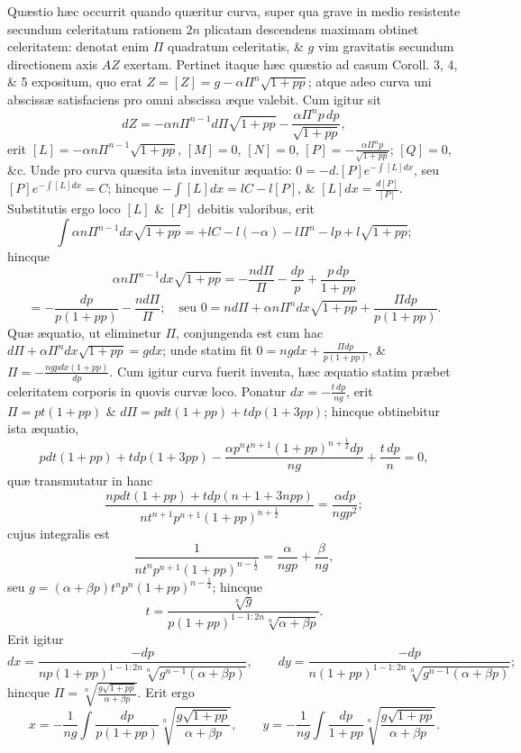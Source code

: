 Quæstio hæc occurrit quando quæritur curva, super qua grave in medio resistente secundum celeritatum rationem $2n$ plicatam descendens maximam obtinet celeritatem: denotat enim $\Pi$ quadratum celeritatis, \& $g$ vim gravitatis secundum directionem axis $AZ$ exertam. Pertinet itaque hæc quæstio ad casum Coroll. 3, 4, \& 5 expositum, quo erat $Z=[Z]=g-\alpha\Pi^n\sqrt{1+pp}$; atque adeo curva uni abscissæ satisfaciens pro omni abscissa æque valebit. Cum igitur sit
\[
dZ=-\alpha n\Pi^{n-1}d\Pi\sqrt{1+pp}-\frac{\alpha\Pi^n p\,dp}{\sqrt{1+pp}},
\]
erit $[L]=-\alpha n\Pi^{n-1}\sqrt{1+pp}$, $[M]=0$, $[N]=0$, $[P]=-\frac{\alpha\Pi^n p}{\sqrt{1+pp}}$; $[Q]=0$, \&c. Unde pro curva quæsita ista invenitur æquatio: $0=-d.[P]e^{-\int[L]dx}$, seu $[P]e^{-\int[L]dx}=C$; hincque $-\int[L]dx=lC-l[P]$, \& $[L]dx=\frac{d[P]}{[P]}$. Substitutis ergo loco $[L]$ \& $[P]$ debitis valoribus, erit
\[
\int\alpha n\Pi^{n-1}dx\sqrt{1+pp}=+lC-l(-\alpha)-l\Pi^n-lp+l\sqrt{1+pp};
\]
hincque
\[
\alpha n\Pi^{n-1}dx\sqrt{1+pp}=-\frac{nd\Pi}{\Pi}-\frac{dp}{p}+\frac{p\,dp}{1+pp}
\]
\[
=-\frac{dp}{p(1+pp)}-\frac{nd\Pi}{\Pi};\quad\text{seu }0=nd\Pi+\alpha n\Pi^n dx\sqrt{1+pp}+\frac{\Pi dp}{p(1+pp)}.
\]
Quæ æquatio, ut eliminetur $\Pi$, conjungenda est cum hac $d\Pi+\alpha\Pi^n dx\sqrt{1+pp}=gdx$; unde statim fit $0=ngdx+\frac{\Pi dp}{p(1+pp)}$, \& $\Pi=-\frac{ngpdx(1+pp)}{dp}$. Cum igitur curva fuerit inventa, hæc æquatio statim præbet celeritatem corporis in quovis curvæ loco. Ponatur $dx=-\frac{t\,dp}{ng}$, erit $\Pi=pt(1+pp)$ \& $d\Pi=pdt(1+pp)+tdp(1+3pp)$; hincque obtinebitur ista æquatio,
\[
pdt(1+pp)+tdp(1+3pp)-\frac{\alpha p^n t^{n+1}(1+pp)^{n+\frac12}dp}{ng}+\frac{t\,dp}{n}=0,
\]
quæ transmutatur in hanc
\[
\frac{npdt(1+pp)+tdp(n+1+3npp)}{nt^{n+1}p^{n+1}(1+pp)^{n+\frac12}}=\frac{\alpha dp}{ngp^2};
\]
cujus integralis est
\[
\frac{1}{nt^n p^{n+1}(1+pp)^{n-\frac12}}=\frac{\alpha}{ngp}+\frac{\beta}{ng},
\]
seu $g=(\alpha+\beta p)t^n p^n(1+pp)^{n-\frac12}$; hincque
\[
t=\frac{\sqrt[n]{g}}{p(1+pp)^{1-1:2n}\sqrt[n]{\alpha+\beta p}}.
\]
Erit igitur
\[
dx=\frac{-dp}{np(1+pp)^{1-1:2n}\sqrt[n]{g^{n-1}(\alpha+\beta p)}},\qquad
dy=\frac{-dp}{n(1+pp)^{1-1:2n}\sqrt[n]{g^{n-1}(\alpha+\beta p)}};
\]
hincque $\Pi=\sqrt[n]{\frac{g\sqrt{1+pp}}{\alpha+\beta p}}$. Erit ergo
\[
x=-\frac1{ng}\int\frac{dp}{p(1+pp)}\sqrt[n]{\frac{g\sqrt{1+pp}}{\alpha+\beta p}},\qquad
y=-\frac1{ng}\int\frac{dp}{1+pp}\sqrt[n]{\frac{g\sqrt{1+pp}}{\alpha+\beta p}}.
\]
